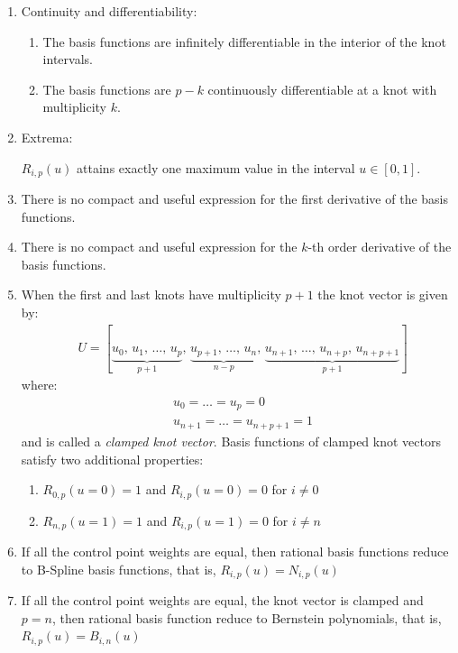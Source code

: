 \begin{enumerate}
    \item Continuity and differentiability:
        \begin{enumerate}
            \item The basis functions are infinitely differentiable in the interior of the knot intervals.
            \item The basis functions are $p-k$ continuously differentiable at a knot with multiplicity $k$.
        \end{enumerate}
        
    \item Extrema:
    
    $R_{i,p}(u)$ attains exactly one maximum value in the interval $u \in [0, 1]$.
    
    \item There is no compact and useful expression for the first derivative of the basis functions.
    
    \item There is no compact and useful expression for the $k$-th order derivative of the basis functions.
        
    \item When the first and last knots have multiplicity $p+1$ the knot vector is given by:
        \begin{align*}
            & U = [\underbrace{u_0,\, u_1,\, \dots,\, u_{p}}_{p+1},\, \underbrace{u_{p+1},\, \dots,\, u_{n}}_{n-p},\, \underbrace{u_{n+1},\, \dots,\, u_{n+p},\, u_{n+p+1}}_{p+1}]
        \end{align*}
        where:
        \begin{align*}
            & u_0 = \dots = u_p = 0 \\
            & u_{n+1} = \dots = u_{n+p+1} = 1
        \end{align*}
    and is called a \textit{clamped knot vector}. Basis functions of clamped knot vectors satisfy two additional properties:
    \begin{enumerate}
            \item $R_{0,p}(u=0) =1$ and $R_{i,p}(u=0)=0$ for $i\neq0$
            \item $R_{n,p}(u=1) =1$ and $R_{i,p}(u=1)=0$ for $i\neq n$
    \end{enumerate}
    
    \item If all the control point weights are equal, then rational basis functions reduce to B-Spline basis functions, that is, $R_{i,p}(u)=N_{i,p}(u)$
    
    \item If all the control point weights are equal, the knot vector is clamped and $p=n$, then rational basis function reduce to Bernstein polynomials, that is, $R_{i,p}(u)=B_{i,n}(u)$
    
\end{enumerate}




